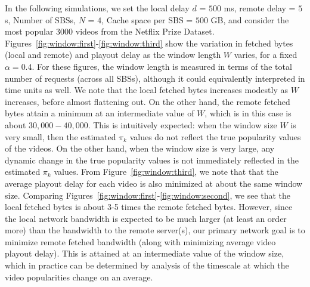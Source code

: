 \documentclass[conference]{IEEEtran}
\begin{document}
In the following simulations, we set the local delay $d$ = $500$ ms, remote delay = $5$ s, Number of SBSs, $N$ = $4$, Cache space per SBS = $500$ GB, and consider the most popular $3000$ videos from the Netflix Prize Dataset. 
Figures~\ref{fig:window:first}-\ref{fig:window:third} show the variation in fetched bytes (local and remote) and playout delay as the window length $W$ varies, for a fixed $\alpha=0.4$. For these figures, the window length is measured in terms of the total number of requests (across all SBSs), although it could equivalently interpreted in time units as well. We note that the local fetched bytes increases modestly as $W$ increases, before almost flattening out. On the other hand, the remote fetched bytes attain a minimum at an intermediate value of $W$, which is in this case is about $30,000-40,000$. This is intuitively expected: when the window size $W$ is very small, then the estimated $\pi_k$ values do not reflect the true popularity values of the videos. On the other hand, when the window size is very large, any dynamic change in the true popularity values is not immediately reflected in the estimated $\pi_k$ values. From Figure~\ref{fig:window:third}, we note that that the average playout delay for each video is also minimized at about the same window size. Comparing Figures~\ref{fig:window:first}-\ref{fig:window:second}, we see that the local fetched bytes is about 3-5 times the remote fetched bytes. However, since the local network bandwidth is expected to be much larger (at least an order more) than the bandwidth to the remote server(s), our primary network goal is to minimize remote fetched bandwidth (along with minimizing average video playout delay). This is attained at an intermediate value of the window size, which in practice can be determined by analysis of the timescale at which the video popularities change on an average.
\end{document}
